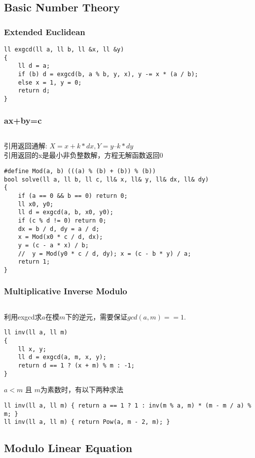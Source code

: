 \documentclass[twoside]{article}
\begin{document}
\subsection{Basic Number Theory}
\subsubsection{Extended Euclidean}
\begin{lstlisting}
ll exgcd(ll a, ll b, ll &x, ll &y)
{
    ll d = a;
    if (b) d = exgcd(b, a % b, y, x), y -= x * (a / b);
    else x = 1, y = 0;
    return d;
}
\end{lstlisting}
\subsubsection{ax+by=c}
\begin{lstlisting}
\end{lstlisting}
引用返回通解: $X = x + k * dx, Y = y – k * dy$\\
引用返回的x是最小非负整数解，方程无解函数返回0
\begin{lstlisting}
#define Mod(a, b) (((a) % (b) + (b)) % (b))
bool solve(ll a, ll b, ll c, ll& x, ll& y, ll& dx, ll& dy)
{
    if (a == 0 && b == 0) return 0;
    ll x0, y0;
    ll d = exgcd(a, b, x0, y0);
    if (c % d != 0) return 0;
    dx = b / d, dy = a / d;
    x = Mod(x0 * c / d, dx);
    y = (c - a * x) / b;
    //  y = Mod(y0 * c / d, dy); x = (c - b * y) / a;
    return 1;
}
\end{lstlisting}
\subsubsection{Multiplicative Inverse Modulo}
\begin{lstlisting}
\end{lstlisting}
利用exgcd求$a$在模$m$下的逆元，需要保证$gcd(a, m) == 1$.
\begin{lstlisting}
ll inv(ll a, ll m)
{
    ll x, y;
    ll d = exgcd(a, m, x, y);
    return d == 1 ? (x + m) % m : -1;
}
\end{lstlisting}
$a < m$ 且 $m$为素数时，有以下两种求法
\begin{lstlisting}
ll inv(ll a, ll m) { return a == 1 ? 1 : inv(m % a, m) * (m - m / a) % m; }
ll inv(ll a, ll m) { return Pow(a, m - 2, m); }
\end{lstlisting}
\subsection{Modulo Linear Equation}
\end{document}
